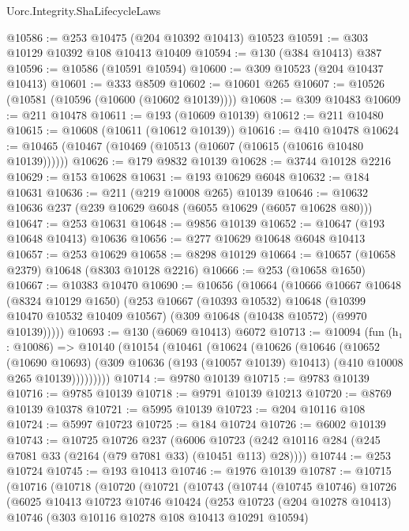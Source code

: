 \begin{lexlean}{Uorc.Integrity.ShaLifecycleLaws}
\begin{coremodule}
@10586 := @253 @10475 (@204 @10392 @10413) @10523
@10591 := @303 @10129 @10392 @108 @10413 @10409
@10594 := @130 (@384 @10413) @387
@10596 := @10586 (@10591 @10594)
@10600 := @309 @10523 (@204 @10437 @10413)
@10601 := @333 @8509
@10602 := @10601 @265
@10607 := @10526 (@10581 (@10596 (@10600 (@10602 @10139))))
@10608 := @309 @10483
@10609 := @211 @10478
@10611 := @193 (@10609 @10139)
@10612 := @211 @10480
@10615 := @10608 (@10611 (@10612 @10139))
@10616 := @410 @10478
@10624 := @10465 (@10467 (@10469 (@10513 (@10607 (@10615 (@10616 @10480 @10139))))))
@10626 := @179 @9832 @10139
@10628 := @3744 @10128 @2216
@10629 := @153 @10628
@10631 := @193 @10629 @6048
@10632 := @184 @10631
@10636 := @211 (@219 @10008 @265) @10139
@10646 := @10632 @10636 @237 (@239 @10629 @6048 (@6055 @10629 (@6057 @10628 @80)))
@10647 := @253 @10631
@10648 := @9856 @10139
@10652 := @10647 (@193 @10648 @10413) @10636
@10656 := @277 @10629 @10648 @6048 @10413
@10657 := @253 @10629
@10658 := @8298 @10129
@10664 := @10657 (@10658 @2379) @10648 (@8303 @10128 @2216)
@10666 := @253 (@10658 @1650)
@10667 := @10383 @10470
@10690 := @10656
    (@10664
      (@10666
        @10667
        @10648
        (@8324 @10129 @1650)
        (@253
          @10667
          (@10393 @10532)
          @10648
          (@10399 @10470 @10532 @10409 @10567)
          (@309 @10648 (@10438 @10572) (@9970 @10139)))))
@10693 := @130 (@6069 @10413) @6072
@10713 := @10094
    (fun (h₁ : @10086) =>
    @10140
      (@10154
        (@10461
          (@10624
            (@10626
              (@10646
                (@10652
                  (@10690 @10693)
                  (@309 @10636 (@193 (@10057 @10139) @10413) (@410 @10008 @265 @10139)))))))))
@10714 := @9780 @10139
@10715 := @9783 @10139
@10716 := @9785 @10139
@10718 := @9791 @10139 @10213
@10720 := @8769 @10139 @10378
@10721 := @5995 @10139
@10723 := @204 @10116 @108
@10724 := @5997 @10723
@10725 := @184 @10724
@10726 := @6002 @10139
@10743 := @10725
    @10726
    @237
    (@6006 @10723 (@242 @10116 @284 (@245 @7081 @33 (@2164 (@79 @7081 @33) (@10451 @113) @28))))
@10744 := @253 @10724
@10745 := @193 @10413
@10746 := @1976 @10139
@10787 := @10715
    (@10716
      (@10718
        (@10720
          (@10721
            (@10743
              (@10744
                (@10745 @10746)
                @10726
                (@6025
                  @10413
                  @10723
                  @10746
                  @10424
                  (@253
                    @10723
                    (@204 @10278 @10413)
                    @10746
                    (@303 @10116 @10278 @108 @10413 @10291 @10594)

\end{coremodule}
\end{lexlean}
